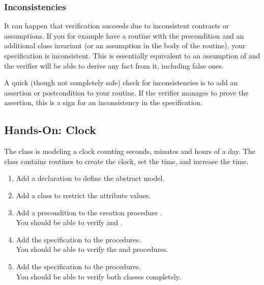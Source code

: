 \subsubsection*{Inconsistencies}

It can happen that verification succeeds due to inconsistent contracts or assumptions. If you for example have a routine with the precondition  and an additional class invariant  (or an assumption  in the body of the routine), your specification is inconsistent. This is essentially equivalent to an assumption of  and the verifier will be able to derive any fact from it, including false ones.

A quick (though not completely safe) check for inconsistencies is to add an assertion or postcondition  to your routine. If the verifier manages to prove the assertion, this is a sign for an inconsistency in the specification.


\subsection{Hands-On: Clock}

The  class is modeling a clock counting seconds, minutes and hours of a day. The class contains routines to create the clock, set the time, and increase the time.

\begin{enumerate}[label=\bfseries Task \arabic*:, leftmargin=1.8cm]
\item Add a  declaration to define the abstract model.
\item Add a class  to restrict the attribute values.
\item Add a precondition to the creation procedure . \\ 
      You should be able to verify  and .
\item Add the specification to the  procedures. \\ 
      You should be able to verify the  and  procedures.
\item Add the specification to the  procedures. \\
      You should be able to verify both classes completely.
\end{enumerate}


